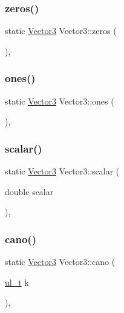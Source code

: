 \mbox{\label{class_vector3_adcaf5345746bf7d0f5da092faf8bf27b}} 
\subsubsection{\texorpdfstring{zeros()}{zeros()}}
{\footnotesize\ttfamily static \mbox{\hyperlink{class_vector3}{Vector3}} Vector3\+::zeros (\begin{DoxyParamCaption}{ }\end{DoxyParamCaption})\hspace{0.3cm}{\ttfamily [inline]}, {\ttfamily [static]}}

\mbox{\label{class_vector3_a7f32f3b57eb6adbec59af6025e6b7778}} 
\subsubsection{\texorpdfstring{ones()}{ones()}}
{\footnotesize\ttfamily static \mbox{\hyperlink{class_vector3}{Vector3}} Vector3\+::ones (\begin{DoxyParamCaption}{ }\end{DoxyParamCaption})\hspace{0.3cm}{\ttfamily [inline]}, {\ttfamily [static]}}

\mbox{\label{class_vector3_af757c4bd03bd4ddfa74c99fd5a3eee94}} 
\subsubsection{\texorpdfstring{scalar()}{scalar()}}
{\footnotesize\ttfamily static \mbox{\hyperlink{class_vector3}{Vector3}} Vector3\+::scalar (\begin{DoxyParamCaption}\item[{double}]{scalar }\end{DoxyParamCaption})\hspace{0.3cm}{\ttfamily [inline]}, {\ttfamily [static]}}

\mbox{\label{class_vector3_a9b119e77ab2040283228425c1c738037}} 
\subsubsection{\texorpdfstring{cano()}{cano()}}
{\footnotesize\ttfamily static \mbox{\hyperlink{class_vector3}{Vector3}} Vector3\+::cano (\begin{DoxyParamCaption}\item[{\mbox{\hyperlink{group___n_algebra_ga1b140a2034db3f5dfe18a987745df43a}{ul\+\_\+t}}}]{k }\end{DoxyParamCaption})\hspace{0.3cm}{\ttfamily [inline]}, {\ttfamily [static]}}


